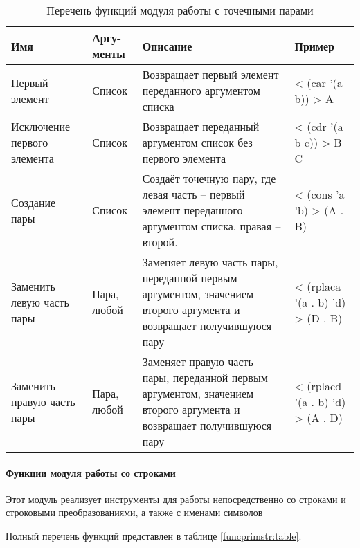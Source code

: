 \begin{xltabular}{\textwidth}{|p{3.6cm}|p{1.8cm}|p{6cm}|X|}
	\caption{Перечень функций модуля работы с точечными парами\label{funcprimpair:table}}\\ \hline
	\centrow Имя & \centrow Аргу- \linebreak менты & \centrow Описание & \centrow Пример \\ \hline
	\finishhead
	Первый элемент & Список & Возвращает первый элемент переданного аргументом списка & < (car '(a b)) \linebreak > A \\ \hline 
	Исключение первого элемента & Список & Возвращает переданный аргументом список без первого элемента & < (cdr '(a b c)) \linebreak > B C \\ \hline 
	Создание пары & Список & Создаёт точечную пару, где левая часть -- первый элемент переданного аргументом списка, правая -- второй. & < (cons 'a 'b) \linebreak > (A . B) \\ \hline 
	Заменить левую часть пары & Пара, любой & Заменяет левую часть пары, переданной первым аргументом, значением второго аргумента и возвращает получившуюся пару & < (rplaca '(a . b) 'd) \linebreak > (D . B) \\ \hline 
	Заменить правую часть пары & Пара, любой & Заменяет правую часть пары, переданной первым аргументом, значением второго аргумента и возвращает получившуюся пару & < (rplacd '(a . b) 'd) \linebreak > (A . D)
	
\end{xltabular}

\paragraph{Функции модуля работы со строками}

Этот модуль реализует инструменты для работы непосредственно со строками и строковыми преобразованиями, а также с именами символов

Полный перечень функций представлен в таблице \ref{funcprimstr:table}.

